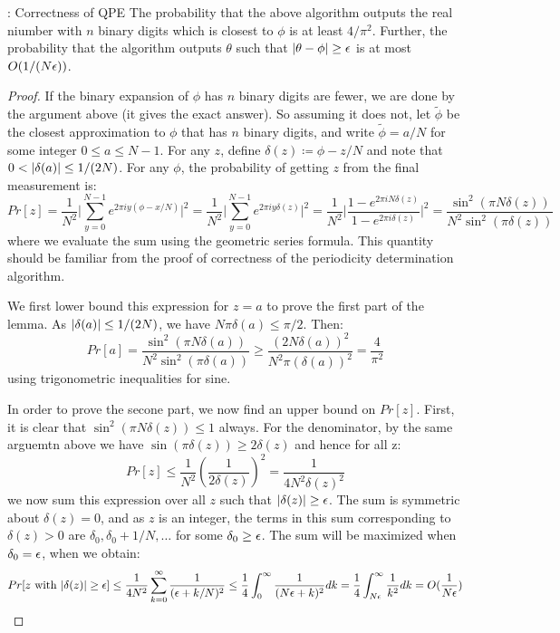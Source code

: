 \begin{thmbox}{: Correctness of QPE}
   The probability that the above algorithm outputs the real niumber with $n$ binary digits which is closest to $\phi$ is at least $4/\pi^2$. Further, the probability that the algorithm outputs $\theta$ such that $\lvert \theta - \phi \rvert \geq \epsilon$ is at most $O(1/(N\epsilon))$.  
\end{thmbox}
\begin{proof}
    If the binary expansion of $\phi$ has $n$ binary digits are fewer, we are done by the argument above (it gives the exact answer). So assuming it does not, let $\tilde{\phi}$ be the closest approximation to $\phi$ that has $n$ binary digits, and write $\tilde{\phi} = a/N$ for some integer $0 \leq a \leq N-1$. For any $z$, define $\delta(z) \coloneqq \phi - z/N$ and note that $0 < \lvert \delta(a) \rvert \leq 1/(2N)$. For any $\phi$, the probability of getting $z$ from the final measurement is:
    \begin{equation}
        Pr[z] = \frac{1}{N^2}\lvert \sum_{y=0}^{N-1}e^{2\pi i y(\phi - x/N)}\rvert^2 = \frac{1}{N^2}\lvert \sum_{y=0}^{N-1}e^{2\pi i y\delta(z)}\rvert^2 = \frac{1}{N^2}\lvert \frac{1 - e^{2\pi i N\delta(z)}}{1 - e^{2\pi i \delta(z)}}\rvert^2 = \frac{\sin^2(\pi N\delta(z))}{N^2\sin^2(\pi \delta(z))}
    \end{equation}
    where we evaluate the sum using the geometric series formula. This quantity should be familiar from the proof of correctness of the periodicity determination algorithm.

    We first lower bound this expression for $z = a$ to prove the first part of the lemma. As $\lvert \delta(a) \rvert \leq 1/(2N)$, we have $N\pi \delta(a) \leq \pi/2$. Then:
    \begin{equation}
        Pr[a] = \frac{\sin^2(\pi N\delta(a))}{N^2\sin^2(\pi \delta(a))} \geq \frac{(2N\delta(a))^2}{N^2\pi(\delta(a))^2} = \frac{4}{\pi^2}
    \end{equation}
    using trigonometric inequalities for sine.

    In order to prove the secone part, we now find an upper bound on $Pr[z]$. First, it is clear that $\sin^2(\pi N\delta(z)) \leq 1$ always. For the denominator, by the same arguemtn above we have $\sin(\pi \delta(z)) \geq 2\delta(z)$ and hence for all z:
    \begin{equation}
        Pr[z] \leq \frac{1}{N^2}\left(\frac{1}{2\delta(z)}\right)^2 = \frac{1}{4N^2\delta(z)^2}
    \end{equation}
    we now sum this expression over all $z$ such that $\lvert \delta(z) \rvert \geq \epsilon$. The sum is symmetric about $\delta(z) = 0$, and as $z$ is an integer, the terms in this sum corresponding to $\delta(z) > 0$ are $\delta_0, \delta_0 + 1/N, \ldots$ for some $\delta_0 \geq \epsilon$. The sum will be maximized when $\delta_0 = \epsilon$, when we obtain:
    \begin{equation}
        Pr[z \text{ with } \lvert \delta(z) \rvert \geq \epsilon] \leq \frac{1}{4N^2}\sum_{k=0}^\infty \frac{1}{(\epsilon + k/N)^2} \leq \frac{1}{4}\int_0^\infty \frac{1}{(N\epsilon + k)^2}dk = \frac{1}{4}\int_{N\epsilon}^\infty \frac{1}{k^2}dk = O(\frac{1}{N\epsilon})
    \end{equation}
\end{proof}
